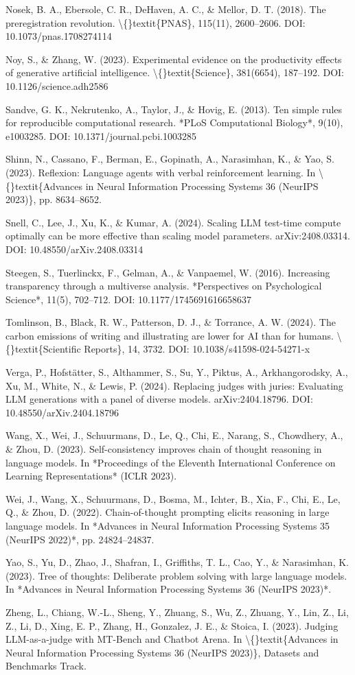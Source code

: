 \documentclass[11pt,a4paper]{article}
\begin{document}
Nosek, B. A., Ebersole, C. R., DeHaven, A. C., \& Mellor, D. T. (2018). The
preregistration revolution. \textbackslash\{\}textit\{PNAS\}, 115(11), 2600–2606.
DOI: 10.1073/pnas.1708274114

Noy, S., \& Zhang, W. (2023). Experimental evidence on the productivity
effects of generative artificial intelligence. \textbackslash\{\}textit\{Science\}, 381(6654),
187–192. DOI: 10.1126/science.adh2586

Sandve, G. K., Nekrutenko, A., Taylor, J., \& Hovig, E. (2013). Ten simple
rules for reproducible computational research. *PLoS Computational
Biology*, 9(10), e1003285. DOI: 10.1371/journal.pcbi.1003285

Shinn, N., Cassano, F., Berman, E., Gopinath, A., Narasimhan, K., \& Yao, S.
(2023). Reflexion: Language agents with verbal reinforcement learning.
In \textbackslash\{\}textit\{Advances in Neural Information Processing Systems 36 (NeurIPS 2023)\},
pp. 8634–8652.

Snell, C., Lee, J., Xu, K., \& Kumar, A. (2024). Scaling LLM test-time
compute optimally can be more effective than scaling model parameters.
arXiv:2408.03314. DOI: 10.48550/arXiv.2408.03314

Steegen, S., Tuerlinckx, F., Gelman, A., \& Vanpaemel, W. (2016). Increasing
transparency through a multiverse analysis. *Perspectives on Psychological
Science*, 11(5), 702–712. DOI: 10.1177/1745691616658637

Tomlinson, B., Black, R. W., Patterson, D. J., \& Torrance, A. W. (2024).
The carbon emissions of writing and illustrating are lower for AI than for
humans. \textbackslash\{\}textit\{Scientific Reports\}, 14, 3732.
DOI: 10.1038/s41598-024-54271-x

Verga, P., Hofstätter, S., Althammer, S., Su, Y., Piktus, A.,
Arkhangorodsky, A., Xu, M., White, N., \& Lewis, P. (2024). Replacing judges
with juries: Evaluating LLM generations with a panel of diverse models.
arXiv:2404.18796. DOI: 10.48550/arXiv.2404.18796

Wang, X., Wei, J., Schuurmans, D., Le, Q., Chi, E., Narang, S.,
Chowdhery, A., \& Zhou, D. (2023). Self-consistency improves chain of thought
reasoning in language models. In *Proceedings of the Eleventh International
Conference on Learning Representations* (ICLR 2023).

Wei, J., Wang, X., Schuurmans, D., Bosma, M., Ichter, B., Xia, F., Chi, E.,
Le, Q., \& Zhou, D. (2022). Chain-of-thought prompting elicits reasoning in
large language models. In *Advances in Neural Information Processing Systems
35 (NeurIPS 2022)*, pp. 24824–24837.

Yao, S., Yu, D., Zhao, J., Shafran, I., Griffiths, T. L., Cao, Y., \&
Narasimhan, K. (2023). Tree of thoughts: Deliberate problem solving with
large language models. In *Advances in Neural Information Processing Systems
36 (NeurIPS 2023)*.

Zheng, L., Chiang, W.-L., Sheng, Y., Zhuang, S., Wu, Z., Zhuang, Y.,
Lin, Z., Li, Z., Li, D., Xing, E. P., Zhang, H., Gonzalez, J. E., \&
Stoica, I. (2023). Judging LLM-as-a-judge with MT-Bench and Chatbot Arena.
In \textbackslash\{\}textit\{Advances in Neural Information Processing Systems 36 (NeurIPS 2023)\},
Datasets and Benchmarks Track.
\end{document}
